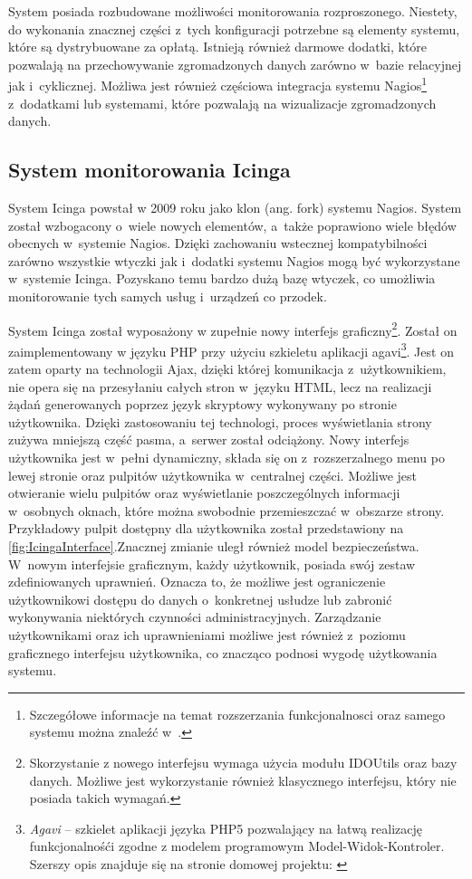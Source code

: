 System posiada rozbudowane możliwości monitorowania
rozproszonego. Niestety, do wykonania znacznej części z~tych
konfiguracji potrzebne są elementy systemu, które są dystrybuowane za
opłatą. Istnieją również darmowe dodatki, które pozwalają na
przechowywanie zgromadzonych danych zarówno w~bazie relacyjnej jak
i~cyklicznej. Możliwa jest również częściowa integracja systemu
Nagios\footnote{Szczegółowe informacje na temat rozszerzania
  funkcjonalnosci oraz samego systemu można znaleźć
  w~\cite{www:Nagios}.}  z~dodatkami lub systemami, które pozwalają na
wizualizacje zgromadzonych danych.

\subsection[Icinga][System monitorowania Icinga]{System monitorowania Icinga}
\label{subsec:Icinga}

System Icinga powstał w 2009 roku jako klon (ang. fork) systemu
Nagios. System został wzbogacony o~wiele nowych elementów, a~także
poprawiono wiele błędów obecnych w~systemie Nagios. Dzięki zachowaniu
wstecznej kompatybilności zarówno wszystkie wtyczki jak i~dodatki
systemu Nagios mogą być wykorzystane w~systemie Icinga. Pozyskano temu
bardzo dużą bazę wtyczek, co umożliwia monitorowanie tych samych usług
i~urządzeń co przodek.

System Icinga został wyposażony w zupełnie nowy interfejs
graficzny\footnote{Skorzystanie z nowego interfejsu wymaga użycia
  modułu IDOUtils oraz bazy danych. Możliwe jest wykorzystanie również
  klasycznego interfejsu, który nie posiada takich wymagań.}. Został
on zaimplementowany w języku PHP przy użyciu szkieletu aplikacji
agavi\footnote{{\em Agavi } -- szkielet aplikacji języka PHP5
  pozwalający na łatwą realizację funkcjonalnośći zgodne z modelem
  programowym Model-Widok-Kontroler. Szerszy opis znajduje się na
  stronie domowej projektu: \cite{www:Agavi}}. Jest on zatem oparty na
technologii Ajax, dzięki której komunikacja z~użytkownikiem, nie opera
się na przesyłaniu całych stron w~języku HTML, lecz na realizacji
żądań generowanych poprzez język skryptowy wykonywany po stronie
użytkownika. Dzięki zastosowaniu tej technologi, proces wyświetlania
strony zużywa mniejszą część pasma, a~serwer został odciążony. Nowy
interfejs użytkownika jest w~pełni dynamiczny, składa się on
z~rozszerzalnego menu po lewej stronie oraz pulpitów użytkownika
w~centralnej części. Możliwe jest otwieranie wielu pulpitów oraz
wyświetlanie poszczególnych informacji w~osobnych oknach, które można
swobodnie przemieszczać w~obszarze strony. Przykładowy pulpit dostępny
dla użytkownika został przedstawiony na
\ref{fig:IcingaInterface}.Znacznej zmianie uległ również model
bezpieczeństwa. W~nowym interfejsie graficznym, każdy użytkownik,
posiada swój zestaw zdefiniowanych uprawnień. Oznacza to, że możliwe
jest ograniczenie użytkownikowi dostępu do danych o~konkretnej usłudze
lub zabronić wykonywania niektórych czynności
administracyjnych. Zarządzanie użytkownikami oraz ich uprawnieniami
możliwe jest również z~poziomu graficznego interfejsu użytkownika, co
znacząco podnosi wygodę użytkowania systemu.

